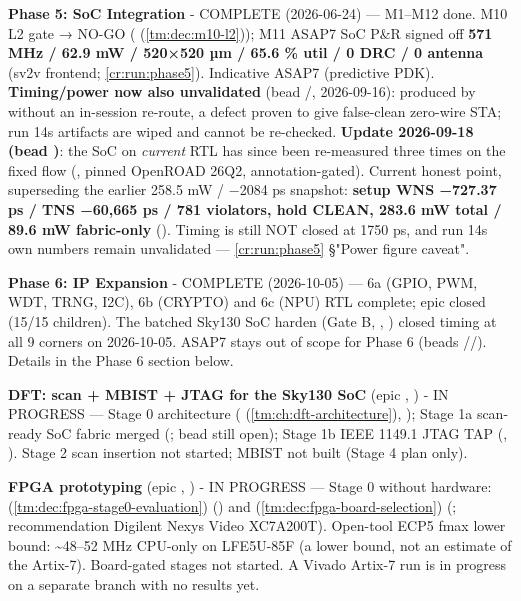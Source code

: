 \begin{record}

\textbf{Phase 5: SoC Integration} - \ok{} COMPLETE (2026-06-24) ---
M1--M12 done. M10 L2 gate → NO-GO
( (\cref{tm:dec:m10-l2})); M11 ASAP7 SoC P\&R signed off
\textbf{571 MHz / 62.9 mW / 520×520 µm / 65.6 \% util / 0 DRC / 0
antenna} (sv2v frontend; \cref{cr:run:phase5}). Indicative
ASAP7 (predictive PDK). \warn{} \textbf{Timing/\allowbreak{}power now
also unvalidated} (bead /, 2026-09-16): produced by
 without an in-session re-route, a defect
proven to give false-clean zero-wire STA; run 14\textquotesingle s
artifacts are wiped and cannot be re-checked. \ok{} \textbf{Update
2026-09-18 (bead )}: the SoC on \emph{current} RTL has since
been re-measured three times on the fixed flow
(, pinned OpenROAD 26Q2,
annotation-gated). Current honest point, superseding the earlier 258.5
mW / −2084 ps snapshot: \textbf{setup WNS −727.37 ps / TNS −60,665 ps /
781 violators, hold CLEAN, 283.6 mW total / 89.6 mW fabric-only}
(). Timing is still NOT closed at 1750 ps,
and run 14\textquotesingle s own numbers remain unvalidated ---
\cref{cr:run:phase5} §"Power figure caveat".

\textbf{Phase 6: IP Expansion} - \ok{} COMPLETE (2026-10-05) --- 6a
(GPIO, PWM, WDT, TRNG, I2C), 6b (CRYPTO) and 6c (NPU) RTL complete; epic
 closed (15/15 children). The batched Sky130 SoC harden (Gate
B, , ) closed timing at all 9 corners on
2026-10-05. ASAP7 stays out of scope for Phase 6 (beads
//). Details in the Phase 6 section below.

\textbf{DFT: scan + MBIST + JTAG for the Sky130 SoC} (epic ,
) - \wip{} IN PROGRESS --- Stage 0 architecture \ok{}
( (\cref{tm:ch:dft-architecture}), ); Stage 1a scan-ready
SoC fabric merged (; bead  still open); Stage 1b
IEEE 1149.1 JTAG TAP \ok{} (, ). Stage 2 scan
insertion not started; MBIST not built (Stage 4 plan only).

\textbf{FPGA prototyping} (epic , ) - \wip{} IN
PROGRESS --- Stage 0 \ok{} without hardware:
 (\cref{tm:dec:fpga-stage0-evaluation}) () and
 (\cref{tm:dec:fpga-board-selection}) (; recommendation Digilent
Nexys Video XC7A200T). Open-tool ECP5 fmax lower bound:
\textasciitilde48--52 MHz CPU-only on LFE5U-85F (a lower bound, not an
estimate of the Artix-7). Board-gated stages not started. A Vivado
Artix-7 run is in progress on a separate branch with no results yet.


\end{record}
